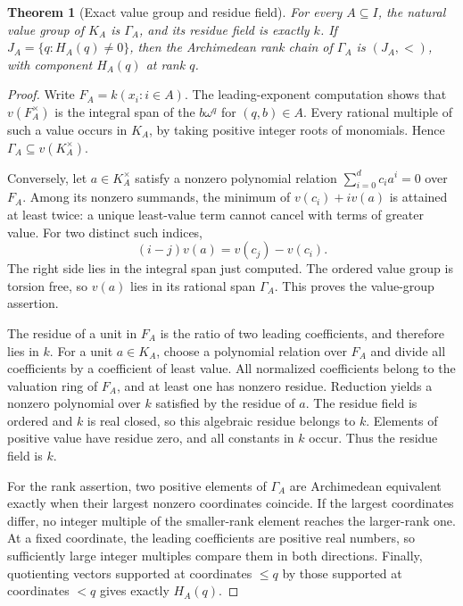 \documentclass[11pt,a4paper]{article}
\numberwithin{equation}{section}
\newtheorem{theorem}{Theorem}[section]
\theoremstyle{definition}
\theoremstyle{remark}
\begin{document}
\begin{theorem}[Exact value group and residue field]
\label{csf:thm:valuation}
For every $A\subseteq I$, the natural value group of $K_A$ is $\Gamma_A$,
and its residue field is exactly $k$. If
$J_A=\{q:H_A(q)\ne0\}$, then the Archimedean rank chain of $\Gamma_A$ is
$(J_A,<)$, with component $H_A(q)$ at rank $q$.
\end{theorem}
\begin{proof}
Write $F_A=k(x_i:i\in A)$. The leading-exponent computation shows that
$v(F_A^\times)$ is the integral span of the $b\omega^q$ for $(q,b)\in A$.
Every rational multiple of such a value occurs in $K_A$, by taking positive
integer roots of monomials. Hence $\Gamma_A\subseteq v(K_A^\times)$.

Conversely, let $a\in K_A^\times$ satisfy a nonzero polynomial relation
$\sum_{i=0}^d c_i a^i=0$ over $F_A$. Among its nonzero summands, the minimum
of $v(c_i)+iv(a)$ is attained at least twice: a unique least-value term
cannot cancel with terms of greater value. For two distinct such indices,
\[
 (i-j)v(a)=v(c_j)-v(c_i).
\]
The right side lies in the integral span just computed. The ordered value
group is torsion free, so $v(a)$ lies in its rational span $\Gamma_A$.
This proves the value-group assertion.

The residue of a unit in $F_A$ is the ratio of two leading coefficients,
and therefore lies in $k$. For a unit $a\in K_A$, choose a polynomial
relation over $F_A$ and divide all coefficients by a coefficient of least
value. All normalized coefficients belong to the valuation ring of $F_A$,
and at least one has nonzero residue. Reduction yields a nonzero polynomial
over $k$ satisfied by the residue of $a$. The residue field is ordered and
$k$ is real closed, so this algebraic residue belongs to $k$. Elements of
positive value have residue zero, and all constants in $k$ occur. Thus the
residue field is $k$.

For the rank assertion, two positive elements of $\Gamma_A$ are
Archimedean equivalent exactly when their largest nonzero coordinates
coincide. If the largest coordinates differ, no integer multiple of the
smaller-rank element reaches the larger-rank one. At a fixed coordinate,
the leading coefficients are positive real numbers, so sufficiently large
integer multiples compare them in both directions. Finally, quotienting
vectors supported at coordinates $\le q$ by those supported at coordinates
$<q$ gives exactly $H_A(q)$.
\end{proof}
\end{document}

